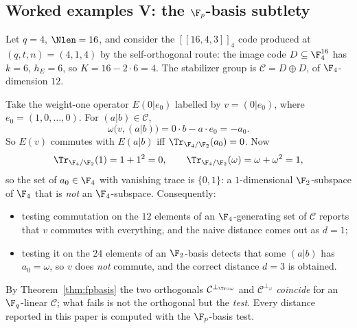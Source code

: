 \subsection{Worked examples V: the \texorpdfstring{$\F_p$}{F\_p}-basis subtlety}

\begin{example}\label{ex:fpbasis}
Let $q=4$, $\Nlen=16$, and consider the $[[16,4,3]]_4$ code produced at
$(q,t,n)=(4,1,4)$ by the self-orthogonal route: the image code
$D\subseteq\F_4^{16}$ has $k=6$, $h_E=6$, so $K=16-2\cdot6=4$. The stabilizer
group is $\mathcal C=D\oplus D$, of $\F_4$-dimension $12$.

Take the weight-one operator $E(0|e_0)$ labelled by $v=(0|e_0)$, where
$e_0=(1,0,\dots,0)$. For $(a|b)\in\mathcal C$,
\[
  \omega\bigl(v,(a|b)\bigr)=0\cdot b-a\cdot e_0=-a_0 .
\]
So $E(v)$ commutes with $E(a|b)$ iff $\Tr_{\F_4/\F_2}(a_0)=0$. Now
\[
  \Tr_{\F_4/\F_2}(1)=1+1^2=0,\qquad \Tr_{\F_4/\F_2}(\omega)=\omega+\omega^2=1,
\]
so the set of $a_0\in\F_4$ with vanishing trace is $\{0,1\}$: a
$1$-dimensional $\F_2$-subspace of $\F_4$ that is \emph{not} an
$\F_4$-subspace. Consequently:
\begin{itemize}[leftmargin=*]
\item testing commutation on the $12$ elements of an $\F_4$-generating set of
  $\mathcal C$ reports that $v$ commutes with everything, and the naive
  distance comes out as $d=1$;
\item testing it on the $24$ elements of an $\F_2$-basis detects that some
  $(a|b)$ has $a_0=\omega$, so $v$ does \emph{not} commute, and the correct
  distance $d=3$ is obtained.
\end{itemize}
By Theorem~\ref{thm:fpbasis} the two orthogonals
$\mathcal C^{\perp_{\Tr\circ\omega}}$ and $\mathcal C^{\perp_\omega}$
\emph{coincide} for an $\F_q$-linear $\mathcal C$; what fails is not the
orthogonal but the \emph{test}. Every distance reported in this paper is
computed with the $\F_p$-basis test.
\end{example}

